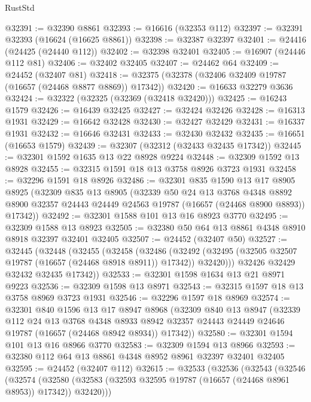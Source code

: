 \begin{lexlean}{RustStd}
\begin{coremodule}
@32391 := @32390 @8861
@32393 := @16616 (@32353 @112)
@32397 := @32391 @32393 (@16624 (@16625 @8861))
@32398 := @32387 @32397
@32401 := @24416 (@24425 (@24440 @112))
@32402 := @32398 @32401
@32405 := @16907 (@24446 @112 @81)
@32406 := @32402 @32405
@32407 := @24462 @64
@32409 := @24452 (@32407 @81)
@32418 := @32375 (@32378 (@32406 @32409 @19787 (@16657 (@24468 @8877 @8869)) @17342))
@32420 := @16633 @32279 @3636
@32424 := @32322 (@32325 (@32369 (@32418 @32420)))
@32425 := @16243 @1579
@32426 := @16439 @32425
@32427 := @32424 @32426
@32428 := @16313 @1931
@32429 := @16642 @32428
@32430 := @32427 @32429
@32431 := @16337 @1931
@32432 := @16646 @32431
@32433 := @32430 @32432
@32435 := @16651 (@16653 @1579)
@32439 := @32307 (@32312 (@32433 @32435 @17342))
@32445 := @32301 @1592 @1635 @13 @22 @8928 @9224
@32448 := @32309 @1592 @13 @8928
@32455 := @32315 @1591 @18 @13 @3758 @8926 @3723 @1931
@32458 := @32296 @1591 @18 @8926
@32486 := @32301
    @835
    @1590
    @13
    @17
    @8905
    @8925
    (@32309
      @835
      @13
      @8905
      (@32339
        @50
        @24
        @13
        @3768
        @4348
        @8892
        @8900
        @32357
        @24443
        @24449
        @24563
        @19787
        (@16657 (@24468 @8900 @8893))
        @17342))
@32492 := @32301 @1588 @101 @13 @16 @8923 @3770
@32495 := @32309 @1588 @13 @8923
@32505 := @32380 @50 @64 @13 @8861 @4348 @8910 @8918 @32397 @32401 @32405
@32507 := @24452 (@32407 @50)
@32527 := @32445
    (@32448
      (@32455
        (@32458
          (@32486
            (@32492 (@32495 (@32505 @32507 @19787 (@16657 (@24468 @8918 @8911)) @17342)) @32420)))
        @32426
        @32429
        @32432
        @32435
        @17342))
@32533 := @32301 @1598 @1634 @13 @21 @8971 @9223
@32536 := @32309 @1598 @13 @8971
@32543 := @32315 @1597 @18 @13 @3758 @8969 @3723 @1931
@32546 := @32296 @1597 @18 @8969
@32574 := @32301
    @840
    @1596
    @13
    @17
    @8947
    @8968
    (@32309
      @840
      @13
      @8947
      (@32339
        @112
        @24
        @13
        @3768
        @4348
        @8933
        @8942
        @32357
        @24443
        @24449
        @24646
        @19787
        (@16657 (@24468 @8942 @8934))
        @17342))
@32580 := @32301 @1594 @101 @13 @16 @8966 @3770
@32583 := @32309 @1594 @13 @8966
@32593 := @32380 @112 @64 @13 @8861 @4348 @8952 @8961 @32397 @32401 @32405
@32595 := @24452 (@32407 @112)
@32615 := @32533
    (@32536
      (@32543
        (@32546
          (@32574
            (@32580 (@32583 (@32593 @32595 @19787 (@16657 (@24468 @8961 @8953)) @17342)) @32420)))

\end{coremodule}
\end{lexlean}

